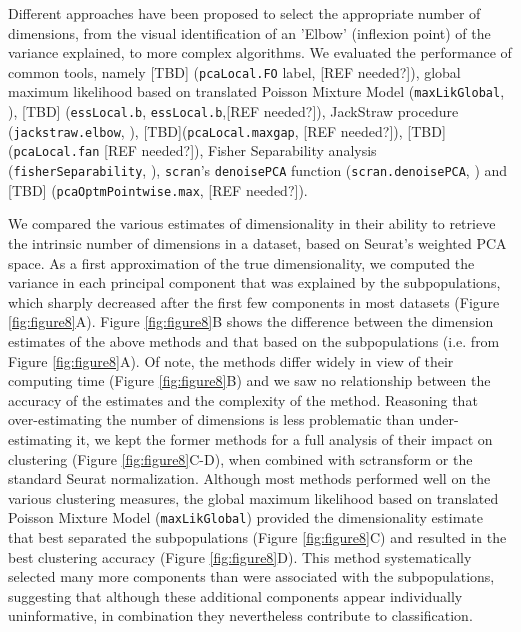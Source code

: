 \documentclass{bmcart}
\begin{document}
Different approaches have been proposed to select the appropriate number of dimensions, from the visual identification of an 'Elbow' (inflexion point) of the variance explained, to more complex algorithms. We evaluated the performance of common tools, namely [TBD] (\texttt{pcaLocal.FO} label, [REF needed?]), global maximum likelihood based on translated Poisson Mixture Model (\texttt{maxLikGlobal}, \citep{haroTranslated2008}), [TBD] (\texttt{essLocal.b}, \texttt{essLocal.b},[REF needed?]), JackStraw procedure (\texttt{jackstraw.elbow}, \citep{ChungJackstraw2015}), [TBD](\texttt{pcaLocal.maxgap}, [REF needed?]), [TBD] (\texttt{pcaLocal.fan} [REF needed?]), Fisher Separability analysis (\texttt{fisherSeparability}, \citep{AlberganteSepar2019}), \texttt{scran}'s \texttt{denoisePCA} function (\texttt{scran.denoisePCA}, \citep{LunScran2016}) and [TBD] (\texttt{pcaOptmPointwise.max}, [REF needed?]).

We compared the various estimates of dimensionality in their ability to retrieve the intrinsic number of dimensions in a dataset, based on Seurat's weighted PCA space. As a first approximation of the true dimensionality, we computed the variance in each principal component that was explained by the subpopulations, which sharply decreased after the first few components in most datasets (Figure \ref{fig:figure8}A). Figure \ref{fig:figure8}B shows the difference between the dimension estimates of the above methods and that based on the subpopulations (i.e. from Figure \ref{fig:figure8}A). Of note, the methods differ widely in view of their computing time (Figure \ref{fig:figure8}B) and we saw no relationship between the accuracy of the estimates and the complexity of the method. Reasoning that over-estimating the number of dimensions is less problematic than under-estimating it, we kept the former methods for a full analysis of their impact on clustering (Figure \ref{fig:figure8}C-D), when combined with sctransform or the standard Seurat normalization. Although most methods performed well on the various clustering measures, the global maximum likelihood based on translated Poisson Mixture Model (\texttt{maxLikGlobal}) provided the dimensionality estimate that best separated the subpopulations (Figure \ref{fig:figure8}C) and resulted in the best clustering accuracy (Figure \ref{fig:figure8}D). This method systematically selected many more components than were associated with the subpopulations, suggesting that although these additional components appear individually uninformative, in combination they nevertheless contribute to classification.
\end{document}
